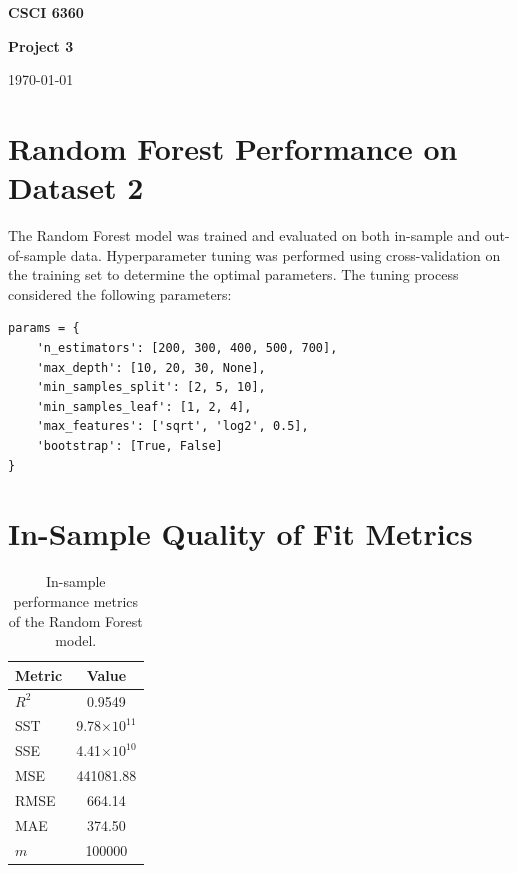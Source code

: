 \documentclass[11pt]{article}
\date{}
\begin{document}
\begin{center} {\LARGE\textbf{{CSCI 6360}}}\end{center}
\begin{center}{\Large \textbf{Project 3}}\end{center}
\begin{center} \date{\today} \today \end{center}
    
\vspace{.1in}

\section{Random Forest Performance on Dataset 2}

The Random Forest model was trained and evaluated on both in-sample and out-of-sample data. Hyperparameter tuning was performed using cross-validation on the training set to determine the optimal parameters. The tuning process considered the following parameters:

\begin{verbatim}
params = {
    'n_estimators': [200, 300, 400, 500, 700],
    'max_depth': [10, 20, 30, None],
    'min_samples_split': [2, 5, 10],
    'min_samples_leaf': [1, 2, 4],
    'max_features': ['sqrt', 'log2', 0.5],
    'bootstrap': [True, False]
}
\end{verbatim}

\section{In-Sample Quality of Fit Metrics}

\begin{table}[h]
\centering
\caption{In-sample performance metrics of the Random Forest model.}
\begin{tabular}{lc}
\hline
Metric & Value \\
\hline
$R^2$ & 0.9549 \\
SST & 9.78$\times 10^{11}$ \\
SSE & 4.41$\times 10^{10}$ \\
MSE & 441081.88 \\
RMSE & 664.14 \\
MAE & 374.50 \\
$m$ & 100000 \\
\hline
\end{tabular}
\end{table}
\end{document}
